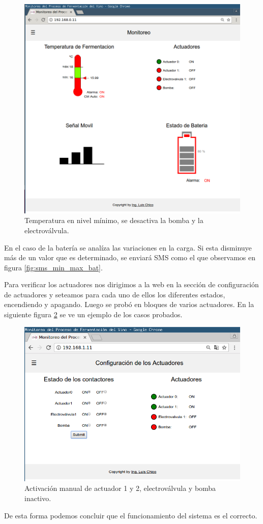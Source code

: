 \begin{figure}[h]
  \centering
  \includegraphics[scale=.25]{./Figures/auto_control_inactive.png}
  \caption{Temperatura en nivel mínimo, se desactiva la bomba y la electroválvula.}
  \label{fig:auto_control_inactive}
\end{figure}


En el caso de la batería se analíza las variaciones en la carga. Si esta disminuye más de un valor que es determinado, se enviará SMS como el que observamos en figura \ref{fig:sms_min_max_bat}. 

Para verificar los actuadores nos dirigimos a la web en la sección de configuración de actuadores y seteamos para cada uno de ellos los diferentes estados, encendiendo y apagando. Luego se probó en bloques de varios actuadores. En la siguiente figura \ref{fig:test_contact} se ve un ejemplo de los casos probados.

\begin{figure}[h]
  \centering
  \includegraphics[scale=.25]{./Figures/test_contact.png}
  \caption{Activación manual de actuador 1 y 2, electroválvula y bomba inactivo.}
  \label{fig:test_contact}
\end{figure}


De esta forma podemos concluir que el funcionamiento del sistema es el correcto.





